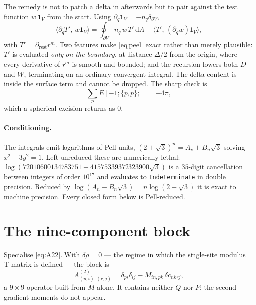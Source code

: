 \documentclass[11pt,a4paper]{article}
\newcommand{\D}{\Delta}
\newcommand{\dd}{\mathrm{d}}
\begin{document}
The remedy is not to patch a delta in afterwards but to pair against the test
function $w\,\mathbf{1}_V$ from the start. Using
$\partial_q\mathbf{1}_V=-n_q\delta_{\partial V}$,
\begin{equation}
\bigl\langle \partial_q T',\,w\mathbf{1}_V\bigr\rangle
 =\oint_{\partial V} n_q\,w\,T'\,\dd A
 -\bigl\langle T',\,(\partial_qw)\mathbf{1}_V\bigr\rangle ,
\label{eq:peel}
\end{equation}
with $T'=\partial_{\text{rest}}r^m$. Two features make \eqref{eq:peel} exact
rather than merely plausible: $T'$ is evaluated \emph{only on the boundary},
at distance $\D/2$ from the origin, where every derivative of $r^m$ is smooth
and bounded; and the recursion lowers both $D$ and $W$, terminating on an
ordinary convergent integral. The delta content is inside the surface term and
cannot be dropped. The sharp check is
\begin{equation}
\sum_p E[-1;\{p,p\};\,] = -4\pi ,
\label{eq:lap}
\end{equation}
which a spherical excision returns as $0$.

\paragraph{Conditioning.} The integrals emit logarithms of Pell units,
$(2\pm\sqrt3)^n=A_n\pm B_n\sqrt3$ solving $x^2-3y^2=1$. Left unreduced these
are numerically lethal: $\log(72010600134783751-41575339372323900\sqrt3)$ is a
$35$-digit cancellation between integers of order $10^{17}$ and evaluates to
\texttt{Indeterminate} in double precision. Reduced by $\log(A_n-B_n\sqrt3)=n\log(2-\sqrt3)$
it is exact to machine precision. Every closed form below is Pell-reduced.

\section{The nine-component block}

Specialise \eqref{eq:A22}. With $\delta\rho=0$ --- the regime in which the
single-site modulus T-matrix is defined --- the block is
\begin{equation}
A^{(2)}_{(p,i),(r,j)}
 =\delta_{pr}\delta_{ij}-M_{in,pk}\,\delta c_{nkrj},
\label{eq:A22static}
\end{equation}
a $9\times 9$ operator built from $M$ alone. It contains neither $Q$ nor $P$:
the second-gradient moments do not appear.
\end{document}
